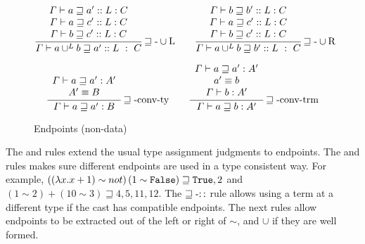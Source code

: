 \begin{figure}
\begin{align*}
  \frac{\begin{array}{c}
  \varGamma\vdash a\sqsupseteq a'::L:C\\
  \varGamma\vdash a\sqsupseteq c'::L:C\\
  \varGamma\vdash b\sqsupseteq c'::L:C
  \end{array}}{\varGamma\vdash a\cup^{L}b\sqsupseteq a'::L\ :\ C}\rulename{\sqsupseteq-\cup L}
  \quad & \quad 
  \frac{\begin{array}{c}
  \varGamma\vdash b\sqsupseteq b'::L:C\\
  \varGamma\vdash a\sqsupseteq c'::L:C\\
  \varGamma\vdash b\sqsupseteq c'::L:C
  \end{array}}{\varGamma\vdash a\cup^{L}b\sqsupseteq b'::L\ :\ C}\rulename{\sqsupseteq-\cup R}
\\
\end{align*}

\begin{align*}
  \frac{\begin{array}{c}
  \varGamma\vdash a\sqsupseteq a':A'\\
  A'\equiv B
  \end{array}}{\varGamma\vdash a\sqsupseteq a':B}\operatorname{\sqsupseteq-conv-ty}
  \quad & \quad 
  \frac{\begin{array}{c}
  \varGamma\vdash a\sqsupseteq a':A'\\
  a'\equiv b\\
  \varGamma\vdash b:A'
  \end{array}}{\varGamma\vdash a\sqsupseteq b:A'}\operatorname{\sqsupseteq-conv-trm}
\\
\end{align*}

\caption{Endpoints (non-data)}
\label{fig:cast-endpoint-rules}
\end{figure}

The  and  rules extend the usual type assignment judgments to endpoints.
The  and  rules makes sure different endpoints are used in a type consistent way.
For example, $\left(\left(\lambda x.x+1\right)\sim not\right) \left( 1\sim \mathtt{False}{} \right) \sqsupseteq \mathtt{True}{} ,2$ and $\left( 1\sim2\right) +\left( 10\sim3\right) \sqsupseteq4,5,11,12$.
The $\operatorname{\sqsupseteq-::}$ rule allows using a term at a different type if the cast has compatible endpoints.
The next rules allow endpoints to be extracted out of the left or right of $\sim$, and $\cup$ if they are well formed.

